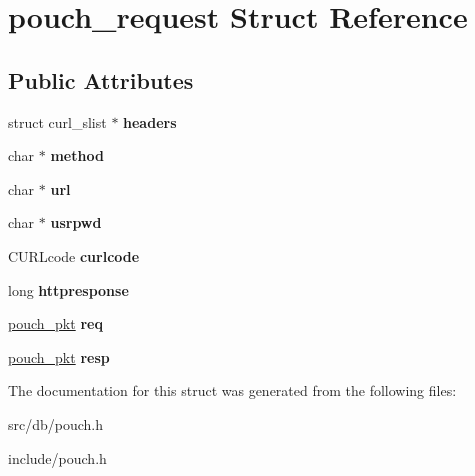 \hypertarget{structpouch__request}{
\section{pouch\_\-request Struct Reference}
\label{structpouch__request}
}
\subsection*{Public Attributes}
\begin{DoxyCompactItemize}
\item 
\hypertarget{structpouch__request_ae3eb7c82a8dcd7dd6c4633b40a2775d1}{
struct curl\_\-slist $\ast$ {\bfseries headers}}
\label{structpouch__request_ae3eb7c82a8dcd7dd6c4633b40a2775d1}

\item 
\hypertarget{structpouch__request_a4f2ed9ffeded60e17c53b4bc7fa788bd}{
char $\ast$ {\bfseries method}}
\label{structpouch__request_a4f2ed9ffeded60e17c53b4bc7fa788bd}

\item 
\hypertarget{structpouch__request_a9e2463986522b25e0dd7527ff41fc974}{
char $\ast$ {\bfseries url}}
\label{structpouch__request_a9e2463986522b25e0dd7527ff41fc974}

\item 
\hypertarget{structpouch__request_a43888e9b64ee47b6285597cab73d4f8f}{
char $\ast$ {\bfseries usrpwd}}
\label{structpouch__request_a43888e9b64ee47b6285597cab73d4f8f}

\item 
\hypertarget{structpouch__request_a91b7cb23a59bbafe8575055e0e99f9b7}{
CURLcode {\bfseries curlcode}}
\label{structpouch__request_a91b7cb23a59bbafe8575055e0e99f9b7}

\item 
\hypertarget{structpouch__request_a1efdcd65e2280b56ee375beb27e85e95}{
long {\bfseries httpresponse}}
\label{structpouch__request_a1efdcd65e2280b56ee375beb27e85e95}

\item 
\hypertarget{structpouch__request_a00397b825f125196d455436a4a5a6a1d}{
\hyperlink{structpouch__pkt}{pouch\_\-pkt} {\bfseries req}}
\label{structpouch__request_a00397b825f125196d455436a4a5a6a1d}

\item 
\hypertarget{structpouch__request_a0b6a0c43c6c1882d69a526075a85411c}{
\hyperlink{structpouch__pkt}{pouch\_\-pkt} {\bfseries resp}}
\label{structpouch__request_a0b6a0c43c6c1882d69a526075a85411c}

\end{DoxyCompactItemize}


The documentation for this struct was generated from the following files:\begin{DoxyCompactItemize}
\item 
src/db/pouch.h\item 
include/pouch.h\end{DoxyCompactItemize}
